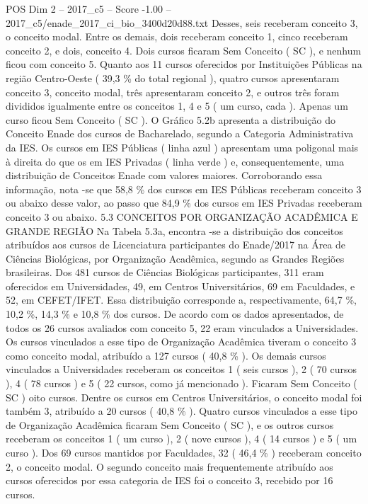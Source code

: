 \begin{textsample}{POS Dim 2 – 2017\_c5 – Score -1.00 – 2017\_c5/enade\_2017\_ci\_bio\_3400d20d88.txt}
Desses, seis receberam conceito 3, o conceito modal.
Entre os demais, dois receberam conceito 1, cinco receberam conceito 2, e dois, conceito 4.
Dois cursos ficaram Sem Conceito ( SC ), e nenhum ficou com conceito 5.
Quanto aos 11 cursos oferecidos por Instituições Públicas na região Centro-Oeste ( 39,3 \% do total regional ), quatro cursos apresentaram conceito 3, conceito modal, três apresentaram conceito 2, e outros três foram divididos igualmente entre os conceitos 1, 4 e 5 ( um curso, cada ).
Apenas um curso ficou Sem Conceito ( SC ).
O Gráfico 5.2b apresenta a distribuição do Conceito Enade dos cursos de Bacharelado, segundo a Categoria Administrativa da IES.
Os cursos em IES Públicas ( linha azul ) apresentam uma poligonal mais à direita do que os em IES Privadas ( linha verde ) e, consequentemente, uma distribuição de Conceitos Enade com valores maiores.
Corroborando essa informação, nota -se que 58,8 \% dos cursos em IES Públicas receberam conceito 3 ou abaixo desse valor, ao passo que 84,9 \% dos cursos em IES Privadas receberam conceito 3 ou abaixo. 5.3 CONCEITOS POR ORGANIZAÇÃO ACADÊMICA E GRANDE REGIÃO Na Tabela 5.3a, encontra -se a distribuição dos conceitos atribuídos aos cursos de Licenciatura participantes do Enade/2017 na Área de Ciências Biológicas, por Organização Acadêmica, segundo as Grandes Regiões brasileiras.
Dos 481 cursos de Ciências Biológicas participantes, 311 eram oferecidos em Universidades, 49, em Centros Universitários, 69 em Faculdades, e 52, em CEFET/IFET.
Essa distribuição corresponde a, respectivamente, 64,7 \%, 10,2 \%, 14,3 \% e 10,8 \% dos cursos.
De acordo com os dados apresentados, de todos os 26 cursos avaliados com conceito 5, 22 eram vinculados a Universidades.
Os cursos vinculados a esse tipo de Organização Acadêmica tiveram o conceito 3 como conceito modal, atribuído a 127 cursos ( 40,8 \% ).
Os demais cursos vinculados a Universidades receberam os conceitos 1 ( seis cursos ), 2 ( 70 cursos ), 4 ( 78 cursos ) e 5 ( 22 cursos, como já mencionado ).
Ficaram Sem Conceito ( SC ) oito cursos.
Dentre os cursos em Centros Universitários, o conceito modal foi também 3, atribuído a 20 cursos ( 40,8 \% ).
Quatro cursos vinculados a esse tipo de Organização Acadêmica ficaram Sem Conceito ( SC ), e os outros cursos receberam os conceitos 1 ( um curso ), 2 ( nove cursos ), 4 ( 14 cursos ) e 5 ( um curso ).
Dos 69 cursos mantidos por Faculdades, 32 ( 46,4 \% ) receberam conceito 2, o conceito modal.
O segundo conceito mais frequentemente atribuído aos cursos oferecidos por essa categoria de IES foi o conceito 3, recebido por 16 cursos.

\end{textsample}
